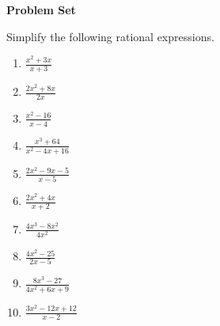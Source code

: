 \textbf{Problem Set}

\vspce

Simplify the following  rational expressions.

\begin{enumerate}[label = \arabic*. ]

\item \hspce $\displaystyle \frac{x^{2}+3x}{x+3}$
\item \hspce $\displaystyle \frac{2x^{2}+8x}{2x}$
\item \hspce $\displaystyle \frac{x^{2}-16}{x-4}$
\item \hspce $\displaystyle \frac{x^{3}+64}{x^{2}-4x+16}$
\item \hspce $\displaystyle \frac{2x^{2}-9x-5}{x-5}$

\item \hspce $\displaystyle \frac{2x^{2}+4x}{x+2}$
\item \hspce $\displaystyle \frac{4x^{3}-8x^2}{4x^2}$
\item \hspce $\displaystyle \frac{4x^{2}-25}{2x-5}$
\item \hspce $\displaystyle \frac{8x^{3}-27}{4x^{2}+6x+9}$
\item \hspce $\displaystyle \frac{3x^{2}-12x+12}{x-2}$

\end{enumerate}


